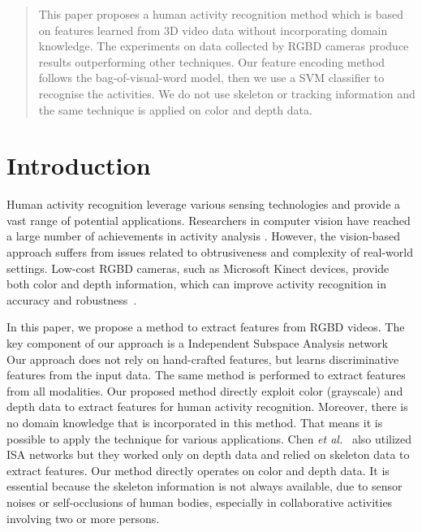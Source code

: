 \documentclass{article}
\begin{document}
 


\begin{abstract} 
This paper proposes a human activity recognition method which is based on features learned from 3D video data without incorporating domain knowledge.
The experiments on data collected by RGBD cameras produce results outperforming other techniques.
Our feature encoding method follows the bag-of-visual-word model, then we use a SVM classifier to recognise the activities.
We do not use skeleton or tracking information and the same technique is applied on color and depth data.
\end{abstract} 

\section{Introduction}
\label{sec:intro}

Human activity recognition leverage various sensing technologies and provide a vast range of potential applications.
Researchers in computer vision have reached a large number of achievements in activity analysis \cite{2011_Ryoo_HumanActivityAnalysis}.
However, the vision-based approach suffers from issues related to obtrusiveness and complexity of real-world settings.
Low-cost RGBD cameras, such as Microsoft Kinect devices, provide both color and depth information, which can improve activity recognition in accuracy and robustness~\cite{2014_Aggarwal_3DReview}.

In this paper, we propose a method to extract features from RGBD videos.
The key component of our approach is a Independent Subspace Analysis network~\cite{2011_Le_ISA}  
Our approach does not rely on hand-crafted features, but learns discriminative features from the input data.
The same method is performed to extract features from all modalities.
Our proposed method directly exploit color (grayscale) and depth data to extract features for human activity recognition.
Moreover, there is no domain knowledge that is incorporated in this method.
That means it is possible to apply the technique for various applications.
Chen \textit{et al.}~\cite{2014_Chen_ISACombination} also utilized ISA networks but they worked only on depth data and relied on skeleton data to extract features.
Our method directly operates on color and depth data.
It is essential because the skeleton information is not always available, due to sensor noises or self-occlusions of human bodies, especially in collaborative activities involving two or more persons.
\end{document}
